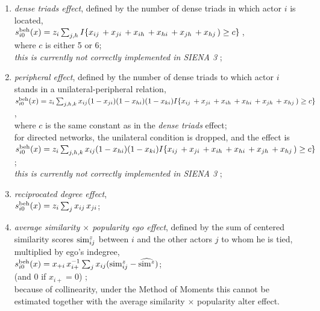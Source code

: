 \documentclass[a4paper,fleqn]{article}
\newcommand{\+}{\, + \,}
\newcommand{\vit}{\theenumi}
\newcommand{\SI}{{\sf SIENA }}
\begin{document}
{\begin{enumerate}
 \item {\em dense triads effect}, defined by the number of dense triads in which actor $i$ is
 located, \\
 $s^{\rm beh}_{i\vit}(x) =  z_i \sum_{j,h} I\{ x_{ij}\, + x_{ji}\, + x_{ih}\, + x_{hi}\,
 + x_{jh}\, + x_{hj}\,)\geq c \}\,$,\\
 where $c$ is either 5 or 6; \\
 \emph{this is currently not correctly implemented in \SI 3 };

 \item {\em peripheral effect}, defined by the number of dense triads to which actor $i$ stands
 in a unilateral-peripheral relation,\\
 $s^{\rm beh}_{i\vit}(x) =  z_i \sum_{j,h,k} x_{ij} (1-x_{ji})(1-x_{hi})(1-x_{ki})
 I\{ x_{ij}\,  + x_{ji}\, + x_{ih}\, + x_{hi}\, + x_{jh}\, + x_{hj}\,)\geq c \} \,$,\\
 where $c$ is the same constant as in the {\it dense triads} effect;\\
 for directed networks, the unilateral condition is dropped, and the effect is\\
 $s^{\rm beh}_{i\vit}(x) =  z_i \sum_{j,h,k} x_{ij} (1-x_{hi})(1-x_{ki})
 I\{ x_{ij}\,  + x_{ji}\, + x_{ih}\, + x_{hi}\, + x_{jh}\, + x_{hj}\,)\geq c \} \,$;\\
 \emph{this is currently not correctly implemented in \SI 3 };

 \item {\em reciprocated degree effect}, \\
 $s^{\rm beh}_{i\vit}(x) = z_i \sum_j x_{ij}\,x_{ji} $;

 \item {\em average similarity $\times$ popularity ego effect}, defined by the
 sum of centered similarity scores ${\rm sim}^z_{ij}$ between $i$
 and the other actors $j$ to whom he is  tied, multiplied by ego's indegree, \\
 $s^{\rm beh}_{i\vit}(x) =  x_{+i} \, x_{i+}^{-1} \sum_j x_{ij} ({\rm sim}^z_{ij} - \widehat{{\rm sim}^z}) $;\\
 (and 0 if $x_{i+} = 0$) ;\\
 because of collinearity, under the Method of Moments this cannot be estimated together with the
  average similarity $\times$ popularity alter effect.


\end{enumerate}}
\end{document}
